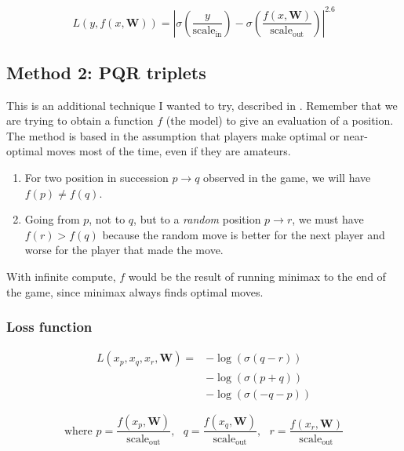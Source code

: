 \[
L(y,f(x,\bm{W}))= \left| \sigma\left(\frac{y}{\text{scale}_{\text{in}}}\right) - \sigma\left(\frac{f(x,\bm{W})}{\text{scale}_{\text{out}}}\right) \right| ^{2.6}
\]


\subsection{Method 2: PQR triplets}

This is an additional technique I wanted to try, described in \cite{dlchess:2014}. Remember that we are trying to obtain a function $f$ (the model) to give an evaluation of a position. The method is based in the assumption that players make optimal or near-optimal moves most of the time, even if they are amateurs.

\begin{enumerate}
\item For two position in succession $p \rightarrow q$  observed in the game, we will have $f(p) \neq f(q)$.
\item Going from $p$, not to $q$, but to a \textit{random} position $p \rightarrow r$, we must have $f(r) > f(q)$ because the random move is better for the next player and worse for the player that made the move.
\end{enumerate}

With infinite compute, $f$ would be the result of running minimax to the end of the game, since minimax always finds optimal moves.


\subsubsection{Loss function}


\begin{align*}
L(x_p, x_q, x_r, \bm{W})=
& -\log\left(\sigma(q - r)\right) \\
& -\log\left(\sigma(p + q)\right) \\
& -\log\left(\sigma(-q - p)\right)
\end{align*}

\[
\text{where }
p = \frac{f(x_p, \bm{W})}{\text{scale}_{\text{out}}},\text{ }
q = \frac{f(x_q, \bm{W})}{\text{scale}_{\text{out}}},\text{ }
r = \frac{f(x_r, \bm{W})}{\text{scale}_{\text{out}}}
\]





